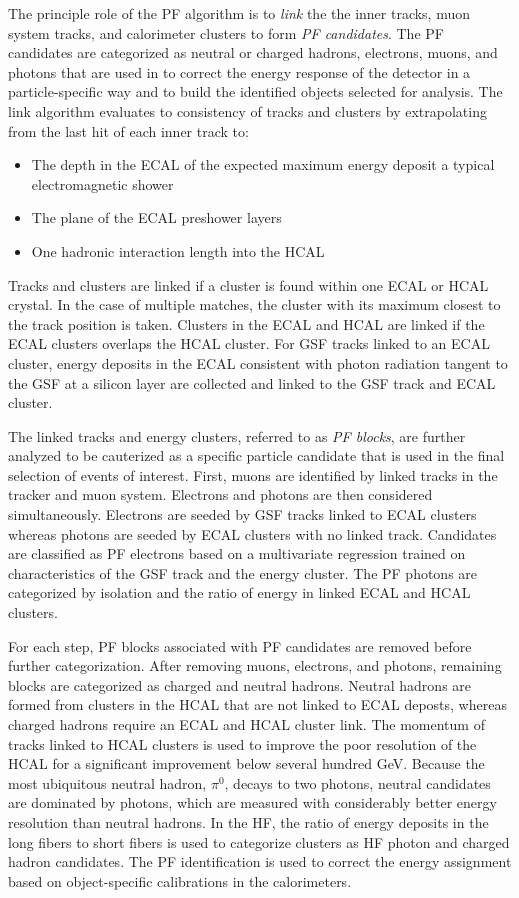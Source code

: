 The principle role of the PF algorithm is to \emph{link} the
the inner tracks, muon system tracks, and calorimeter clusters to form 
\emph{PF candidates}. The PF candidates are categorized as neutral or charged
hadrons, electrons, muons, and photons
that are used in to correct the energy response
of the detector in a particle-specific way and to
build the identified objects selected for analysis. 
The link algorithm evaluates to consistency of tracks and clusters by
extrapolating from the last hit of each inner track to:
\begin{itemize}
  \item The depth in the ECAL of the expected maximum energy deposit a typical electromagnetic shower
  \item The plane of the ECAL preshower layers
  \item One hadronic interaction length into the HCAL
\end{itemize}
Tracks and clusters are linked if a cluster is found within one
ECAL or HCAL crystal. In the case of multiple matches, the cluster
with its maximum closest to the track position is taken.
Clusters in the ECAL and HCAL are linked if the ECAL clusters overlaps
the HCAL cluster. For GSF tracks linked to an ECAL cluster, 
energy deposits in the ECAL consistent with photon radiation 
tangent to the GSF at a silicon layer are collected and linked to the
GSF track and ECAL cluster.

The linked tracks and energy clusters, referred to as \emph{PF blocks},
are further analyzed to be cauterized as a specific particle candidate
that is used in the final selection of events of interest. 
First, muons are identified by linked tracks in the tracker and muon system.
Electrons and photons are then considered simultaneously. Electrons
are seeded by GSF tracks linked to ECAL clusters whereas photons are seeded 
by ECAL clusters with no linked track. Candidates are classified as PF
electrons based on a multivariate regression trained on characteristics
of the GSF track and the energy cluster. The PF photons are categorized
by isolation and the ratio of energy in linked ECAL and HCAL clusters.

For each step, PF blocks associated with PF candidates are removed before
further categorization. After removing muons, electrons, and photons,
remaining blocks are categorized as charged and neutral hadrons.
Neutral hadrons are formed from clusters in the HCAL that are not linked
to ECAL deposts, whereas charged hadrons require an ECAL and HCAL
cluster link. 
The momentum of tracks linked to HCAL clusters is used to improve the poor
resolution of the HCAL for a significant improvement below several hundred GeV.
Because the most ubiquitous neutral hadron, $\pi^{0}$, decays
to two photons, neutral candidates are dominated by photons, which are measured with considerably
better energy resolution than neutral hadrons.
In the HF, the ratio of energy deposits in the long fibers to short fibers
is used to categorize clusters as HF photon and charged hadron candidates.
The PF identification is used to correct the energy assignment based on
object-specific calibrations in the calorimeters.

